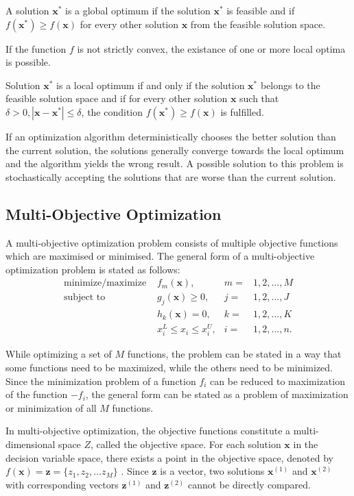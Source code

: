 \begin{mydef}
A solution $\textbf{x}^{*}$ is a global optimum if the solution $\textbf{x}^{*}$ is feasible and if $f(\textbf{x}^{*}) \geq f(\textbf{x})$ for every other solution $\textbf{x}$ from the feasible solution space.
\end{mydef}
If the function $f$ is not strictly convex, the existance of one or more local optima is possible.
\begin{mydef}
Solution $\textbf{x}^{*}$ is a local optimum if and only if the solution $\textbf{x}^{*}$ belongs to the feasible solution space and if for every other solution $\textbf{x}$ such that 
$\delta > 0, |\textbf{x} - \textbf{x}^{*}| \leq \delta$, the condition $f(\textbf{x}^{*}) \geq f(\textbf{x})$ is fulfilled.
\end{mydef}

If an optimization algorithm deterministically chooses the better solution than the current solution, the solutions generally converge towards the local optimum and the algorithm yields the wrong result.
A possible solution to this problem is stochastically accepting the solutions that are worse than the current solution.

\subsection{Multi-Objective Optimization}
A multi-objective optimization problem consists of multiple objective functions which are maximised or minimised. 
The general form of a multi-objective optimization problem is stated as follows:
\begin{align*}
\text{minimize/maximize } & f_m(\textbf{x}),  & m = & 1, 2, ..., M \\
\text{subject to } & g_j(\textbf{x}) \geq 0, & j = & 1, 2, ..., J \\
           & h_k(\textbf{x}) = 0, & k = & 1, 2, ..., K \\
           & x_{i}^{L} \leq x_i \leq x_{i}^{U}, & i = & 1, 2, ..., n. 
\end{align*}

While optimizing a set of $M$ functions, the problem can be stated in a way that some functions need to be maximized, while the others need to be minimized. 
Since the minimization problem of a function $f_i$ can be reduced to maximization of the function $-f_i$, the general form can be stated as a problem of maximization or minimization of all $M$ functions.

In multi-objective optimization, the objective functions constitute a multi-dimensional space $Z$, called the objective space. 
For each solution $\textbf{x}$ in the decision variable space, there exists a point in the objective space, denoted by $f(\textbf{x}) = \textbf{z} = \{z_1, z_2, ... z_M\}$ 
\cite{deb2001multi}. 
Since $\textbf{z}$ is a vector, two solutions 
$\textbf{x}^{(1)}$ and $\textbf{x}^{(2)}$ with corresponding vectors $\textbf{z}^{(1)}$ and $\textbf{z}^{(2)}$ cannot be directly compared. 

